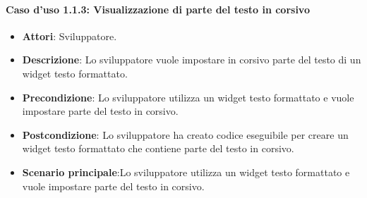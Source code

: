 \paragraph{Caso d'uso 1.1.3: Visualizzazione di parte del testo in corsivo}
\begin{itemize}
\item\textbf{Attori}: Sviluppatore.
\item\textbf{Descrizione}: Lo sviluppatore vuole impostare in corsivo parte del testo di un widget testo formattato.
\item\textbf{Precondizione}: Lo sviluppatore utilizza un widget testo formattato e vuole impostare parte del testo in corsivo.
\item\textbf{Postcondizione}: Lo sviluppatore ha creato codice eseguibile per creare un widget testo formattato che contiene parte del testo in corsivo.
\item\textbf{Scenario principale}:Lo sviluppatore utilizza un widget testo formattato e vuole impostare parte del testo in corsivo.
\end{itemize}
